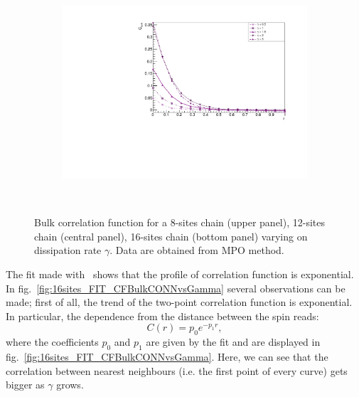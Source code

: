 \begin{figure}[H]
\begin{subfigure}{\columnwidth}
    \includegraphics[scale=0.6]{Figures/16sites/16sites_CFBulkCONNVSgamma.pdf}
    \label{fig:16sites_LMvsGamma}
\end{subfigure}\\
\captionsetup{width=1.\linewidth}
\caption{Bulk correlation function for a 8-sites chain (upper panel), 12-sites chain (central panel), 16-sites chain (bottom panel) varying on dissipation rate $\gamma$. Data are obtained from MPO method.}
\label{fig:BulkCFvsGamma3panelsSizes}
\end{figure}

The fit made with~\cite{root_cern} shows that the profile of correlation function is exponential. In fig.~\ref{fig:16sites_FIT_CFBulkCONNvsGamma} several observations can be made; first of all, the trend of the two-point correlation function is exponential. In particular, the dependence from the distance between the spin reads:
\begin{equation*}
    C(r) = p_0 e^{-p_1 r},
\end{equation*}
where the coefficients $p_0$ and $p_1$ are given by the fit and are displayed in fig.~\ref{fig:16sites_FIT_CFBulkCONNvsGamma}. Here, we can see that the correlation between nearest neighbours (i.e. the first point of every curve) gets bigger as $\gamma$ grows.

